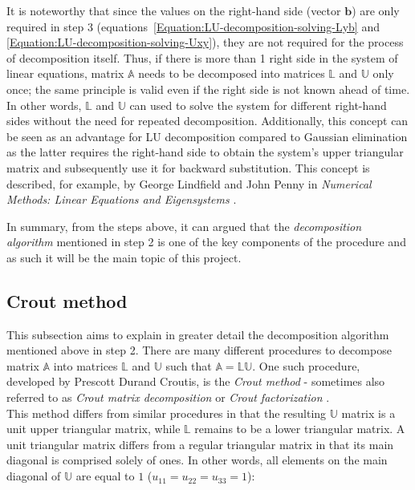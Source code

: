 It is noteworthy that since the values on the right-hand side (vector $ \textbf{b} $) are only required in step 3 (equations~\ref{Equation:LU-decomposition-solving-Lyb} and \ref{Equation:LU-decomposition-solving-Uxy}), they are not required for the process of decomposition itself. Thus, if there is more than 1 right side in the system of linear equations, matrix $ \mathbb{A} $ needs to be decomposed into matrices $ \mathbb{L} $ and $ \mathbb{U} $ only once; the same principle is valid even if the right side is not known ahead of time. In other words, $ \mathbb{L} $ and $ \mathbb{U} $ can used to solve the system for different right-hand sides without the need for repeated decomposition. Additionally, this concept can be seen as an advantage for LU decomposition compared to Gaussian elimination as the latter requires the right-hand side to obtain the system's upper triangular matrix and subsequently use it for backward substitution. This concept is described, for example, by George Lindfield and John Penny in \emph{Numerical Methods: Linear Equations and Eigensystems} \cite{Lindfield2019}.

In summary, from the steps above, it can argued that the \textit{decomposition algorithm} mentioned in step 2 is one of the key components of the procedure and as such it will be the main topic of this project.

\subsection{Crout method \TO}\label{Subsection:LU-decomposition-crout-method}
This subsection aims to explain in greater detail the decomposition algorithm mentioned above in step 2. There are many different procedures to decompose matrix $ \mathbb{A} $ into matrices $ \mathbb{L} $ and $ \mathbb{U} $ such that $ \mathbb{A} = \mathbb{LU} $. One such procedure, developed by Prescott Durand Croutis, is the \textit{Crout method} - sometimes also referred to as \textit{Crout matrix decomposition} or \textit{Crout factorization} \cite{Press2007}. \\
This method differs from similar procedures in that the resulting $ \mathbb{U} $ matrix is a unit upper triangular matrix, while $ \mathbb{L} $ remains to be a lower triangular matrix. A unit triangular matrix differs from a regular triangular matrix in that its main diagonal is comprised solely of ones. In other words, all elements on the main diagonal of $ \mathbb{U} $ are equal to $ 1 $ ($ u_{11} = u_{22} = u_{33} = 1 $):

